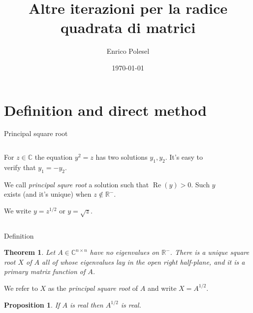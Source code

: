 \documentclass{beamer}
\title{Altre iterazioni per la radice quadrata di matrici}
\date{\today}
\author{Enrico Polesel}
\newcounter{counter1}
\theoremstyle{plain}
\newtheorem{myteo}[counter1]{Theorem}
\newtheorem{mypro}[counter1]{Proposition}
\theoremstyle{definition}
\theoremstyle{remark}
\newcommand{\pa}[1]{\left(#1\right)}
\DeclareMathOperator{\re}{Re}
\begin{document}
\maketitle

\section{Definition and direct method}

\begin{frame}{Principal square root}
  \begin{columns}[T]
    \begin{column}{.45\textwidth}
      For $z\in \mathbb{C}$ the equation $y^2 = z$ has two solutions $y_1,
      y_2$. It's easy to verify that $y_1 = -y_2$.
      \vspace{20pt}
      
      We call \textit{principal squre root} a solution such that
      $\re\pa{y} > 0$. Such $y$ exists (and it's unique) when $z
      \not\in \mathbb{R}^-$.
      \vspace{20pt}

      We write $y = z ^{1/2}$ or $y = \sqrt{z}$.
    \end{column}
    \begin{column}{.6\textwidth}
      \begin{figure}
      \end{figure}
    \end{column}
  \end{columns}
\end{frame}

\begin{frame}{Definition}
  \begin{myteo}
    Let $A \in \mathbb{C} ^ {n \times n}$ have no eigenvalues on
    $\mathbb{R}^-$. There is a unique square root $X$ of $A$ all of
    whose eigenvalues lay in the open right half-plane, and it is a
    primary matrix function of $A$. 
  \end{myteo}

  We refer to $X$ as the \textit{principal square root} of $A$ and
  write $X = A^{1/2}$.
  \vfill

  \begin{mypro}
    If $A$ is real then $A^{1/2}$ is real.    
  \end{mypro}
\end{frame}
\end{document}
